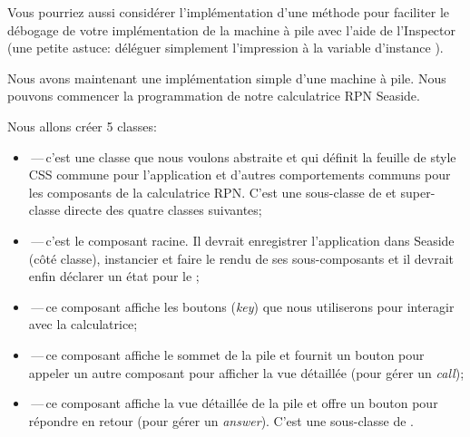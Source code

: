 \documentclass[a4paper,10pt,twoside]{book}
\begin{document}
Vous pourriez aussi considérer l'implémentation d'une méthode
 pour faciliter le débogage de votre
implémentation de la machine à pile avec l'aide de l'Inspector
(une petite astuce: déléguer simplement l'impression  à
la variable d'instance ).


Nous avons maintenant une implémentation simple d'une machine à
pile. Nous pouvons commencer la programmation de notre calculatrice
RPN Seaside.

Nous allons créer 5 classes:
\begin{itemize}
  \item {}\,---\,c'est une classe que nous voulons
    abstraite et qui définit la feuille de style CSS commune pour
    l'application et d'autres comportements communs pour les
    composants de la calculatrice RPN.
C'est une sous-classe de  et super-classe directe des
quatre classes suivantes;
  \item {}\,---\,c'est le composant racine.
      Il devrait enregistrer l'application dans Seaside (côté classe),
      instancier et faire le rendu de ses sous-composants et il
      devrait enfin déclarer un état pour le \backtracking;
  \item {}\,---\,ce composant affiche les boutons
    (\emph{key}) que nous utiliserons pour interagir avec la
    calculatrice;
  \item {}\,---\,ce composant affiche le sommet de la pile
    et fournit un bouton pour appeler un autre composant pour afficher
    la vue détaillée
(\ie pour gérer un \emph{call});
  \item {}\,---\,ce composant affiche la vue
    détaillée de la pile et offre un bouton pour répondre en retour
(\ie pour gérer un \emph{answer}).
C'est une sous-classe de .
\end{itemize}

\end{document}
